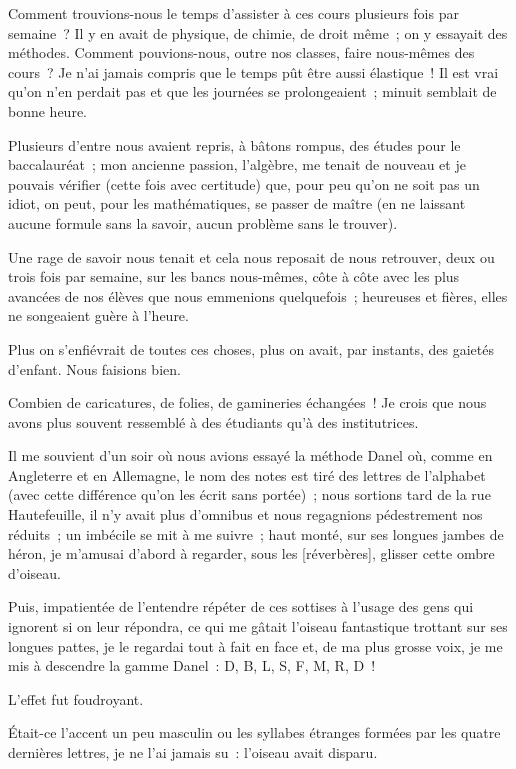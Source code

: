 \documentclass[french,twoside]{book} %
\newcommand\corr[1]{#1}
\begin{document}
Comment trouvions-nous le temps d’assister à ces cours plusieurs fois par semaine ? Il y en avait de physique, de chimie, de droit même ; on y essayait des méthodes. Comment pouvions-nous, outre nos classes, faire nous-mêmes des cours ? Je n’ai jamais compris que le temps pût être aussi élastique ! Il est vrai qu’on n’en perdait pas et que les journées se prolongeaient ; minuit semblait de bonne heure.\par
Plusieurs d’entre nous avaient repris, à bâtons rompus, des études pour le baccalauréat ; mon ancienne passion, l’algèbre, me tenait de nouveau et je pouvais vérifier (cette fois avec certitude) que, pour peu qu’on ne soit pas un idiot, on peut, pour les mathématiques, se passer de maître (en ne laissant aucune formule sans la savoir, aucun problème sans le trouver).\par
Une rage de savoir nous tenait et cela nous reposait de nous retrouver, deux ou trois fois par semaine, sur les bancs nous-mêmes, côte à côte avec les plus avancées de nos élèves que nous emmenions quelquefois ; heureuses et fières, elles ne songeaient guère à l’heure.\par
Plus on s’enfiévrait de toutes ces choses, plus  on avait, par instants, des gaietés d’enfant. Nous faisions bien.\par
Combien de caricatures, de folies, de gamineries échangées ! Je crois que nous avons plus souvent ressemblé à des étudiants qu’à des institutrices.\par
Il me souvient d’un soir où nous avions essayé la méthode Danel où, comme en Angleterre et en Allemagne, le nom des notes est tiré des lettres de l’alphabet (avec cette différence qu’on les écrit sans portée) ; nous sortions tard de la rue Hautefeuille, il n’y avait plus d’omnibus et nous regagnions pédestrement nos réduits ; un imbécile se mit à me suivre ; haut monté, sur ses longues jambes de héron, je m’amusai d’abord à regarder, sous les [{\corr réverbères}], glisser cette ombre d’oiseau.\par
Puis, impatientée de l’entendre répéter de ces sottises à l’usage des gens qui ignorent si on leur répondra, ce qui me gâtait l’oiseau fantastique trottant sur ses longues pattes, je le regardai tout à fait en face et, de ma plus grosse voix, je me mis à descendre la gamme Danel : D, B, L, S, F, M, R, D !\par
L’effet fut foudroyant.\par
Était-ce l’accent un peu masculin ou les syllabes étranges formées par les quatre dernières  lettres, je ne l’ai jamais su : l’oiseau avait disparu.\par
\end{document}
